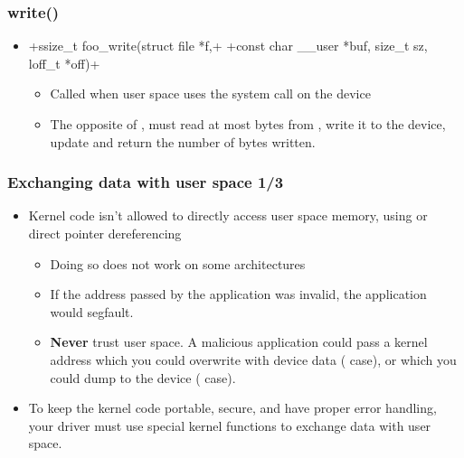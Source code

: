 \begin{frame}[fragile]
  \frametitle{write()}
  \begin{itemize}
  \item {}+ssize_t foo_write(struct file *f,+
    +const char __user *buf, size_t sz, loff_t *off)+
    \begin{itemize}
    \item Called when user space uses the  system call
      on the device
    \item The opposite of , must read at most 
      bytes from , write it to the device, update 
      and return the number of bytes written.
    \end{itemize}
  \end{itemize}
\end{frame}

\begin{frame}
  \frametitle{Exchanging data with user space 1/3}
  \begin{itemize}
  \item Kernel code isn't allowed to directly access user space
    memory, using  or direct pointer dereferencing
    \begin{itemize}
    \item Doing so does not work on some architectures
    \item If the address passed by the application was invalid, the
      application would segfault.
    \item {\bf Never} trust user space. A malicious application could
      pass a kernel address which you could overwrite with device data
      ( case), or which you could dump to the device
      ( case). 
    \end{itemize}
  \item To keep the kernel code portable, secure, and have proper
    error handling, your driver must use special kernel functions
    to exchange data with user space.
  \end{itemize}
\end{frame}

